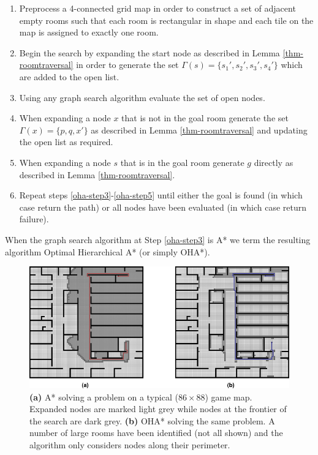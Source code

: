 \begin{enumerate}
\item{\label{oha-step1} Preprocess a 4-connected grid map in order to construct a set of adjacent empty rooms such that 
each room is rectangular in shape and each tile on the map is assigned to exactly one room. }
\item{\label{oha-step2} Begin the search by expanding the start node as described in 
Lemma \ref{thm-roomtraversal} in order to generate the set 
$\Gamma(s) = \lbrace s_{1}', s_{2}', s_{3}', s_{4}'\rbrace$ which are added to the open list. }
\item{\label{oha-step3} Using any graph search algorithm evaluate the set of open nodes.}
\item{\label{oha-step4} When expanding a node $x$ that is not in the goal room generate the set 
$\Gamma(x) = \lbrace p, q, x' \rbrace$ as described in Lemma \ref{thm-roomtraversal} and updating the open
list as required.} 
\item{\label{oha-step5} When expanding a node $s$ that is in the goal room generate $g$ directly as 
described in Lemma \ref{thm-roomtraversal}.} 
\item{Repeat steps \ref{oha-step3}-\ref{oha-step5} until either the goal is found (in which case return
the path) or all nodes have been evaluated (in which case return failure).}
\end{enumerate}
When the graph search algorithm at Step \ref{oha-step3} is A* we term the resulting algorithm 
Optimal Hierarchical A* (or simply OHA*).

\begin{figure}[htbp]
	\label{fig-oha_contrast}
	\vspace{-4pt}
       \begin{center}
           \includegraphics[scale=0.50, trim = 10mm 10mm 10mm 0mm]{diagrams/oha_contrast.png}
       \end{center}
	\vspace{-3pt}
       \caption{\textbf{(a)} A* solving a problem on a typical ($86\times88$) game map. 
Expanded nodes are marked light grey while nodes at the frontier of the search are dark grey.
\textbf{(b)} OHA* solving the same problem. A number of large rooms have been identified (not
all shown) and the algorithm only considers nodes along their perimeter.}
       \label{fig-ohacontrast}
	\vspace{-15pt}
\end{figure}



